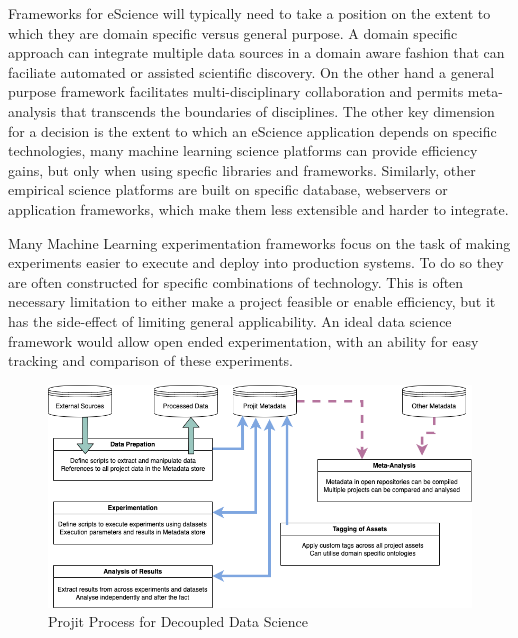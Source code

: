 \documentclass[sigconf]{acmart}
\begin{document}
Frameworks for eScience will typically need to take a position on the extent to which 
they are domain specific versus general purpose. A domain specific approach can 
integrate multiple data sources in a domain aware fashion that can faciliate 
automated or assisted scientific discovery\cite{Howe2008,Pettit:2010}. On the
other hand a general purpose framework facilitates multi-disciplinary collaboration 
and permits meta-analysis that transcends the boundaries of disciplines. 
The other key dimension for a decision is the extent to which an eScience 
application depends on specific technologies, many machine learning science platforms
can provide efficiency gains, but only when using specfic libraries and 
frameworks\cite{Alberti:2018,MolnerDomenech:2020}. Similarly, other empirical 
science platforms are built on specific database, webservers or application
frameworks, which make them less extensible and harder to integrate.

Many Machine Learning experimentation frameworks focus on the task of making experiments
easier to execute and deploy into production systems\cite{Alberti:2018,MolnerDomenech:2020}.
To do so they are often constructed for specific combinations of technology.
This is often necessary limitation to either make a project feasible or enable efficiency,
but it has the side-effect of limiting general applicability. An ideal data science
framework would allow open ended experimentation, with an ability for easy tracking
and comparison of these experiments.

\begin{figure}
\includegraphics[scale=0.6]{./images/Projit_decoupled_process.drawio.png}
\caption{Projit Process for Decoupled Data Science}
\label{fig:projit}
\end{figure}
\end{document}
